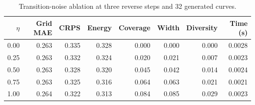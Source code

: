 \begin{table}[t]
\caption{Transition-noise ablation at three reverse steps and 32 generated curves.}
\label{tab:noise_ablation}
\centering\scriptsize
\begin{tabular}{rrrrrrrr}
\toprule
$\eta$ & Grid MAE & CRPS & Energy & Coverage & Width & Diversity & Time (s)\\
\midrule
0.00 & 0.263 & 0.335 & 0.328 & 0.000 & 0.000 & 0.000 & 0.0028\\
0.25 & 0.263 & 0.332 & 0.324 & 0.020 & 0.021 & 0.007 & 0.0023\\
0.50 & 0.263 & 0.328 & 0.320 & 0.045 & 0.042 & 0.014 & 0.0024\\
0.75 & 0.263 & 0.325 & 0.316 & 0.064 & 0.063 & 0.021 & 0.0021\\
1.00 & 0.264 & 0.322 & 0.313 & 0.084 & 0.085 & 0.029 & 0.0023\\
\bottomrule
\end{tabular}
\end{table}